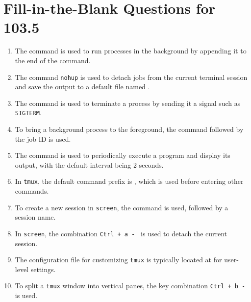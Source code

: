 \documentclass[a4paper]{report}
\begin{document}
\newpage
\section*{Fill-in-the-Blank Questions for 103.5}

\begin{enumerate}[1.]
\item The \underline{\hspace{2cm}} command is used to run processes in the background by appending it to the end of the command.

\item The command \texttt{nohup} is used to detach jobs from the current terminal session and save the output to a default file named \underline{\hspace{2cm}}.

\item The \underline{\hspace{2cm}} command is used to terminate a process by sending it a signal such as \texttt{SIGTERM}.

\item To bring a background process to the foreground, the command \underline{\hspace{2cm}} followed by the job ID is used.

\item The \underline{\hspace{2cm}} command is used to periodically execute a program and display its output, with the default interval being 2 seconds.

\item In \texttt{tmux}, the default command prefix is \underline{\hspace{2cm}}, which is used before entering other commands.

\item To create a new session in \texttt{screen}, the command \underline{\hspace{2cm}} is used, followed by a session name.

\item In \texttt{screen}, the combination \texttt{Ctrl + a - \underline{\hspace{2cm}}} is used to detach the current session.

\item The configuration file for customizing \texttt{tmux} is typically located at \underline{\hspace{2cm}} for user-level settings.

\item To split a \texttt{tmux} window into vertical panes, the key combination \texttt{Ctrl + b - \underline{\hspace{2cm}}} is used.
\end{enumerate}
\end{document}

